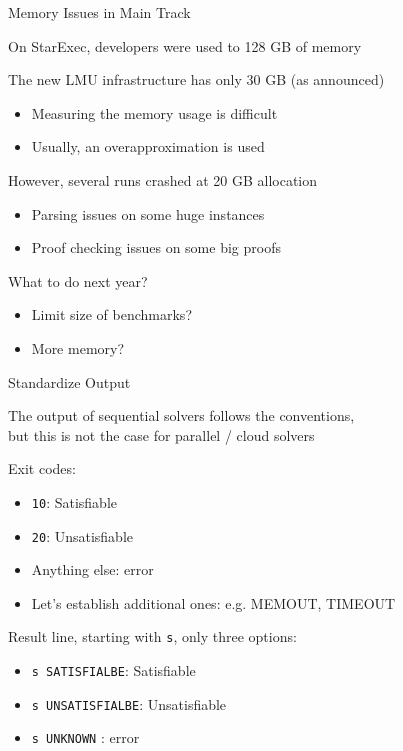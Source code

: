 \documentclass{beamer}
\begin{document}
\begin{frame}{Memory Issues in Main Track}

\large

On StarExec, developers were used to 128 GB of memory

\bigskip

The new LMU infrastructure has only 30 GB (as announced)
\begin{itemize}
\item Measuring the memory usage is difficult 
\item Usually, an overapproximation is used
\end{itemize}

\bigskip

However, several runs crashed at 20 GB allocation
\begin{itemize}
\item Parsing issues on some huge instances
\item Proof checking issues on some big proofs
\end{itemize}

\pause
\bigskip

What to do next year?
\begin{itemize}
\item Limit size of benchmarks?
\item More memory?
\end{itemize}

\end{frame}

\begin{frame}{Standardize Output}

\large

The output of sequential solvers follows the conventions,\\
but this is not the case for parallel / cloud solvers

\bigskip

Exit codes:
\begin{itemize}
\item {\tt 10}: Satisfiable
\item {\tt 20}: Unsatisfiable
\item Anything else: error
\item Let's establish additional ones: e.g. MEMOUT, TIMEOUT\!\!\!\!
\end{itemize}

\bigskip

Result line, starting with {\tt s}, only three options:
\begin{itemize}
\item {\tt s SATISFIALBE}: Satisfiable
\item {\tt s UNSATISFIALBE}: Unsatisfiable
\item {\tt s UNKNOWN} : error
\end{itemize}

\end{frame}
\end{document}
